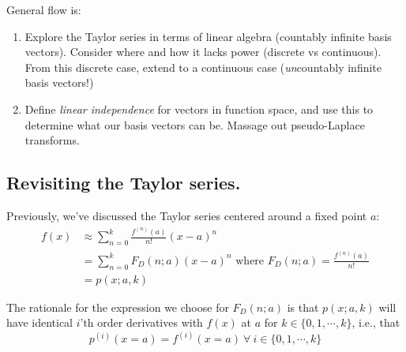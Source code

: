 \documentclass[letterpaper,12pt]{report}
\begin{document}





General flow is:

\begin{enumerate}
  \item
    Explore the Taylor series in terms of linear algebra (countably infinite basis vectors).
    Consider where and how it lacks power (discrete vs continuous).
    From this discrete case, extend to a continuous case
    (\emph{un}countably infinite basis vectors!)
  \item
    Define \emph{linear independence} for vectors in function space, 
    and use this to determine what our basis vectors can be.
    Massage out pseudo-Laplace transforms.

\end{enumerate}

\subsection{Revisiting the Taylor series.}

Previously, we've discussed the Taylor series centered around a fixed point \(a\):
\begin{equation}
\begin{split}
  f(x) &\approx \sum_{n=0}^{k}\frac{f^{(n)}(a)}{n!}(x-a)^n  \\
       &= \sum_{n=0}^{k}F_D(n; a) (x-a)^n \text{ where } F_D(n;a) = \frac{f^{(n)}(a)}{n!} \\
       &= p(x;a,k)
\end{split}
\end{equation}\label{equation:taylor-series}

The rationale for the expression we choose for \(F_D(n;a)\) 
is that \(p(x;a,k)\) will have identical \(i\)'th order derivatives with \(f(x)\) at \(a\)
for \(k \in \{0, 1, \cdots, k\}\), i.e., that
\[p^{(i)}(x=a) = f^{(i)}(x=a) \ \forall \ i \in \{0, 1, \cdots, k \}    \]
\end{document}

